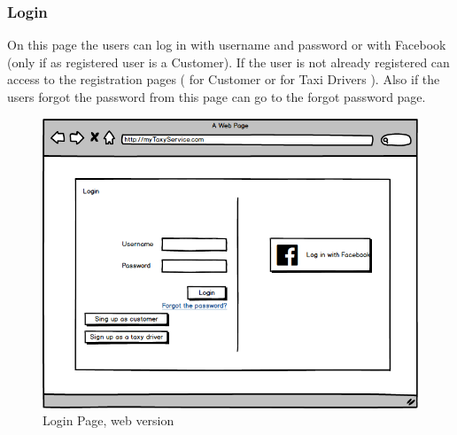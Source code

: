 \documentclass{report}
\begin{document}
			\subsubsection{Login}
			On this page the users can log in with username and password or with Facebook (only if as registered user is a Customer). If the user is not already registered can access to the 					registration pages ( for Customer or for Taxi Drivers ). Also if the users forgot the password from this page can go to the forgot password page.
			\begin{figure}[H]
			\centering
			\includegraphics[scale=0.5]{IMG/UserInterfaces/CustomerLogin.png}
			\caption{Login Page, web version}\label{visina8}
			\end{figure}
\end{document}
